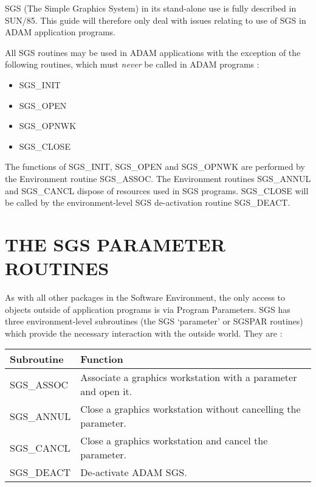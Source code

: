 SGS (The Simple Graphics System) in its stand-alone use is fully described 
in SUN/85.
This guide will therefore only deal with issues relating to use of SGS in
ADAM application programs.

All SGS routines may be used in ADAM applications with the exception of the
following routines, which must {\em never} be called in ADAM programs :
\begin{itemize}
\item SGS\_INIT
\item SGS\_OPEN
\item SGS\_OPNWK
\item SGS\_CLOSE
\end{itemize}
The functions of SGS\_INIT, SGS\_OPEN and SGS\_OPNWK are performed by the
Environment routine SGS\_ASSOC.
The Environment routines SGS\_ANNUL and SGS\_CANCL dispose of resources used in
SGS programs.
SGS\_CLOSE will be called by the environment-level SGS de-activation routine
SGS\_DEACT.

\section{THE SGS PARAMETER ROUTINES}
As with all other packages in the Software Environment, the only access to
objects outside of application programs is via Program Parameters.
SGS has three environment-level subroutines (the SGS `parameter' or SGSPAR 
routines) which provide the necessary interaction with the outside world.
They are :

\begin{center}
\begin{tabular}{||l|l||} \hline
Subroutine & Function \\ \hline
SGS\_ASSOC  & Associate a graphics workstation with a parameter and open it.\\
SGS\_ANNUL  & Close a graphics workstation without cancelling the parameter.\\
SGS\_CANCL  & Close a graphics workstation and cancel the parameter.\\
SGS\_DEACT  & De-activate ADAM SGS.\\ \hline
\end{tabular}
\end{center}

